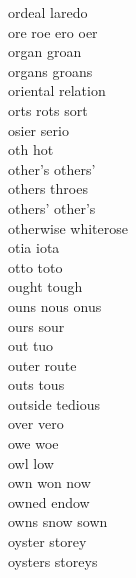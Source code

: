 ordeal laredo\\
ore roe ero oer\\
organ groan\\
organs groans\\
oriental relation\\
orts rots sort\\
osier serio\\
oth hot\\
other's others'\\
others throes\\
others' other's\\
otherwise whiterose\\
otia iota\\
otto toto\\
ought tough\\
ouns nous onus\\
ours sour\\
out tuo\\
outer route\\
outs tous\\
outside tedious\\
over vero\\
owe woe\\
owl low\\
own won now\\
owned endow\\
owns snow sown\\
oyster storey\\
oysters storeys\\

